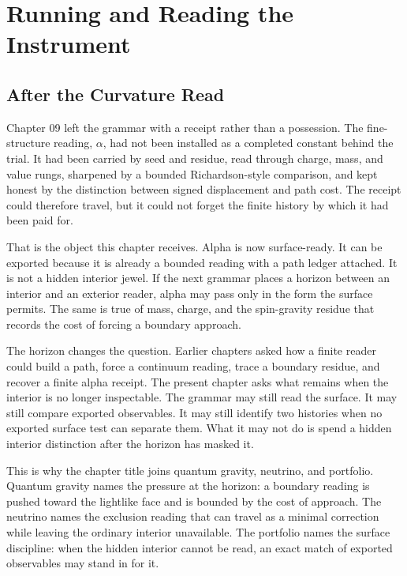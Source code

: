 \chapter{Running and Reading the Instrument}
\label{chap:quantum-gravity-neutrino-portfolio}

\section{After the Curvature Read}

Chapter 09 left the grammar with a receipt rather than a possession. The
fine-structure reading, \(\alpha\), had not been installed as a completed
constant behind the trial. It had been carried by seed and residue, read
through charge, mass, and value rungs, sharpened by a bounded
Richardson-style comparison, and kept honest by the distinction between
signed displacement and path cost. The receipt could therefore travel, but it
could not forget the finite history by which it had been paid for.

That is the object this chapter receives. Alpha is now surface-ready. It can
be exported because it is already a bounded reading with a path ledger
attached. It is not a hidden interior jewel. If the next grammar places a
horizon between an interior and an exterior reader, alpha may pass only in
the form the surface permits. The same is true of mass, charge, and the
spin-gravity residue that records the cost of forcing a boundary approach.

The horizon changes the question. Earlier chapters asked how a finite reader
could build a path, force a continuum reading, trace a boundary residue, and
recover a finite alpha receipt. The present chapter asks what remains when
the interior is no longer inspectable. The grammar may still read the
surface. It may still compare exported observables. It may still identify
two histories when no exported surface test can separate them. What it may
not do is spend a hidden interior distinction after the horizon has masked
it.

This is why the chapter title joins quantum gravity, neutrino, and
portfolio. Quantum gravity names the pressure at the horizon: a boundary
reading is pushed toward the lightlike face and is bounded by the cost of
approach. The neutrino names the exclusion reading that can travel as a
minimal correction while leaving the ordinary interior unavailable. The
portfolio names the surface discipline: when the hidden interior cannot be
read, an exact match of exported observables may stand in for it.

